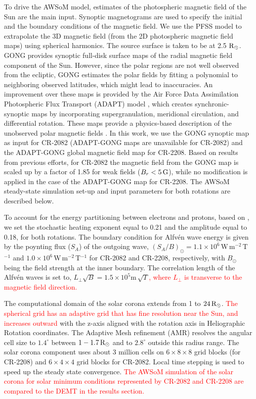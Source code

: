 \documentclass[namedreferences]{solarphysics}
\def\edit#1{\textcolor{Red}{#1}}
\newcommand{\mdeg}{^\circ}
\newcommand{\mrsun}{{\rm R_\odot}}
\begin{document}
\begin{article}
To drive {the AWSoM model, estimates} of the photospheric magnetic field of the Sun {are the main} input. Synoptic magnetograms are used to specify the initial and the boundary conditions of the {magnetic field.} We use the PFSS model to extrapolate the 3D magnetic field (from the 2D photospheric magnetic field maps) using spherical harmonics. The source surface is taken to be at 2.5 $\mrsun$. GONG provides synoptic full-disk surface maps of the radial magnetic field component of the Sun. However, since the polar regions are not well observed from the ecliptic, GONG estimates the polar fields by fitting a polynomial to neighboring observed latitudes, which might lead to inaccuracies. An improvement over these maps is provided by the Air Force Data Assimilation Photospheric Flux Transport (ADAPT) model \citep{Wor2000}, which creates synchronic-synoptic maps by incorporating supergranulation, meridional circulation, and differential rotation. These maps provide a physics-based description of the unobserved polar magnetic fields \citep{Arg2010, Hen2012}. In this work, we use the GONG synoptic map as input for CR-2082 (ADAPT-GONG maps are unavailable for CR-2082) and the ADAPT-GONG global magnetic field map for CR-2208. {Based on results from previous efforts, for CR-2082} the magnetic field from the GONG map is scaled up by a factor of 1.85 {for weak fields ($B_r< 5\,\rm{G}$), while no modification is applied in the case of} the ADAPT-GONG map for CR-2208. The AWSoM steady-state simulation set-up and input parameters for both rotations are described below. 

To account for the energy partitioning between electrons and protons, based on \citet{Cha2011}, we set the stochastic heating exponent {equal to} 0.21 and the amplitude equal to {0.18, for both} rotations. The boundary condition for Alfv\'{e}n wave energy is given by the {poynting flux ($S_{A}$)} of the outgoing {wave, $({S_{A}/}{B})_{\odot} = 1.1\times 10^{6}$\,W\,m$^{-2}$\,T$^{-1}$ and $1.0\times 10^{6}$\,W\,m$^{-2}$\,T$^{-1}$ for CR-2082 and CR-2208, respectively, with $B_{\odot}$ being the field} strength at the inner boundary. The correlation length of the Alfv\'{e}n waves is set {to, $L_{\perp} \sqrt{B} = 1.5 \times 10^{5}$m\,$\sqrt{T}$}\edit{, where $L_{\perp}$ is transverse to the magnetic field direction.}

{The computational domain of the solar corona} extends from 1 to {$24\,\mrsun$}. \edit{The spherical grid has an adaptive grid that has fine resolution near the Sun, and increases outward} with the z-axis aligned with the rotation axis in Heliographic Rotation coordinates. The Adaptive Mesh refinement (AMR) resolves the angular cell size to $1.4\mdeg$ between $1 - 1.7\,\mrsun$ and to $2.8\mdeg$ outside this radius range. The solar corona component uses about 3 million cells on $6 \times 8 \times 8$ grid blocks (for CR-2208) and $6 \times 4 \times 4$ grid blocks for CR-2082. Local time stepping is used to speed up the steady state convergence. \edit{The AWSoM simulation of the solar corona for solar minimum conditions represented by CR-2082 and CR-2208 are compared to the DEMT in the results section.}


\end{article}
\end{document}

